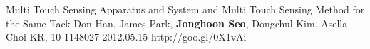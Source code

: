 \begin{cventries}
  \cvpatententry
    {Multi Touch Sensing Apparatus and System and Multi Touch Sensing Method for the Same} %
    {Tack-Don Han, James Park, \textbf{Jonghoon Seo}, Dongchul Kim, Asella Choi} %
    {KR, 10-1148027} %
    {2012.05.15} %
    {http://goo.gl/0X1vAi}
\end{cventries}